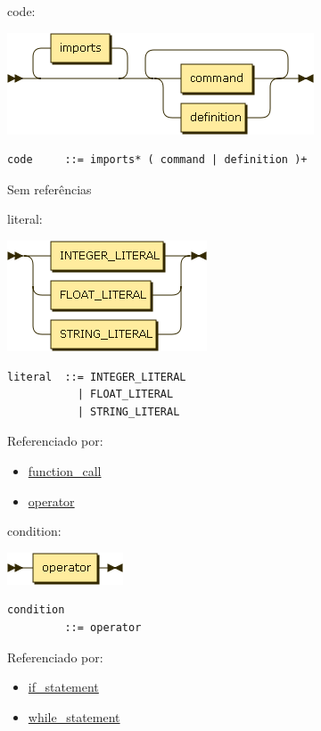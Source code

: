 \protect\hypertarget{code}{}{code:}

\includegraphics[width=3.58333in,height=1.18750in]{diagram/code.png}

\begin{verbatim}
code     ::= imports* ( command | definition )+
\end{verbatim}

Sem referências

\protect\hypertarget{literal}{}{literal:}

\includegraphics[width=2.33333in,height=1.29167in]{diagram/literal.png}

\begin{verbatim}
literal  ::= INTEGER_LITERAL
           | FLOAT_LITERAL
           | STRING_LITERAL
\end{verbatim}

Referenciado por:

\begin{itemize}
\tightlist
\item
  \protect\hyperlink{function_call}{function\_call}
\item
  \protect\hyperlink{operator}{operator}
\end{itemize}

\protect\hypertarget{condition}{}{condition:}

\includegraphics[width=1.35417in,height=0.37500in]{diagram/condition.png}

\begin{verbatim}
condition
         ::= operator
\end{verbatim}

Referenciado por:

\begin{itemize}
\tightlist
\item
  \protect\hyperlink{if_statement}{if\_statement}
\item
  \protect\hyperlink{while_statement}{while\_statement}
\end{itemize}

